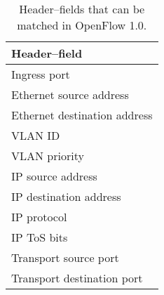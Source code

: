 \begin{table}
  \centering
  \begin{tabular}{l}
     \textbf{Header--field} \\
    \hline
     Ingress port \\

     Ethernet source address \\
     Ethernet destination address \\

     VLAN ID \\
     VLAN priority \\

     IP source address \\
     IP destination address \\
     IP protocol \\
     IP \ac{ToS} bits \\

     Transport source port \\
     Transport destination port \\
  \end{tabular}
  \caption{Header--fields that can be matched in OpenFlow 1.0.}
  \label{table:openflow-1.0.headers}
\end{table}

